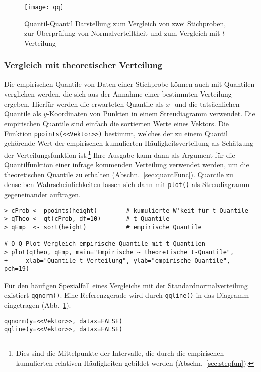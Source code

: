 \begin{figure}[ht]
\centering
\texttt{[image: qq]}
\vspace*{-0.5em}
\caption{Quantil-Quantil Darstellung zum Vergleich von zwei Stichproben, zur Überprüfung von Normalverteiltheit und zum Vergleich mit $t$-Verteilung}
\label{fig:qq}
\end{figure}

\subsubsection{Vergleich mit theoretischer Verteilung}

Die empirischen Quantile von Daten einer Stichprobe können auch mit Quantilen verglichen werden, die sich aus der Annahme einer bestimmten Verteilung ergeben. Hierfür werden die erwarteten Quantile als $x$- und die tatsächlichen Quantile als $y$-Koordinaten von Punkten in einem Streudiagramm verwendet. Die empirischen Quantile sind einfach die sortierten Werte eines Vektors. Die Funktion \lstinline!ppoints(<<Vektor>>)! bestimmt, welches der zu einem Quantil gehörende Wert der empirischen kumulierten Häufigkeitsverteilung als Schätzung der Verteilungsfunktion ist.\footnote{Dies sind die Mittelpunkte der Intervalle, die durch die empirischen kumulierten relativen Häufigkeiten gebildet werden (Abschn.\ \ref{sec:stepfun}).} Ihre Ausgabe kann dann als Argument für die Quantilfunktion einer infrage kommenden Verteilung verwendet werden, um die theoretischen Quantile zu erhalten (Abschn.\ \ref{sec:quantFunc}). Quantile zu denselben Wahrscheinlichkeiten lassen sich dann mit \lstinline!plot()! als Streudiagramm gegeneinander auftragen.
\begin{lstlisting}
> cProb <- ppoints(height)        # kumulierte W'keit für t-Quantile
> qTheo <- qt(cProb, df=10)       # t-Quantile
> qEmp  <- sort(height)           # empirische Quantile

# Q-Q-Plot Vergleich empirische Quantile mit t-Quantilen
> plot(qTheo, qEmp, main="Empirische ~ theoretische t-Quantile",
+     xlab="Quantile t-Verteilung", ylab="empirische Quantile", pch=19)
\end{lstlisting}

Für den häufigen Spezialfall eines Vergleichs mit der Standardnormalverteilung existiert \lstinline!qqnorm()!. Eine Referenzgerade wird durch \lstinline!qqline()! in das Diagramm eingetragen (Abb.\ \ref{fig:qq}).
\begin{lstlisting}
qqnorm(y=<<Vektor>>, datax=FALSE)
qqline(y=<<Vektor>>, datax=FALSE)
\end{lstlisting}

